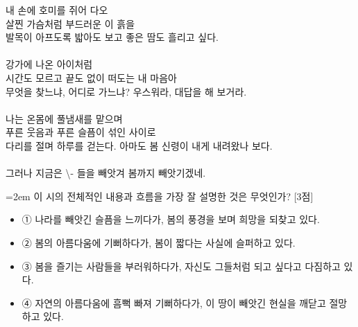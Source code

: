 \documentclass[10pt,a4paper]{article}
\newcommand{\qnum}[1]{%
  \tikz[baseline=(num.base)]{%
    \node[circle, fill=numCircle, text=white, inner sep=0pt,
          minimum size=18pt, font=\small\bfseries] (num) {#1};%
  }%
}
\newcommand{\pts}[1]{%
  \hfill\textcolor{ptsBadge}{[#1점]}%
}
\begin{document}
\begin{tcolorbox}[passage]
내 손에 호미를 쥐어 다오   \\{}
살찐 가슴처럼 부드러운 이 흙을   \\{}
발목이 아프도록 밟아도 보고 좋은 땀도 흘리고 싶다. \\{}
\vspace{4pt} \\{}
강가에 나온 아이처럼   \\{}
시간도 모르고 끝도 없이 떠도는 내 마음아   \\{}
무엇을 찾느냐, 어디로 가느냐? 우스워라, 대답을 해 보거라. \\{}
\vspace{4pt} \\{}
나는 온몸에 풀냄새를 맡으며   \\{}
푸른 웃음과 푸른 슬픔이 섞인 사이로   \\{}
다리를 절며 하루를 걷는다. 아마도 봄 신령이 내게 내려왔나 보다. \\{}
\vspace{4pt} \\{}
그러나 지금은 \textbackslash{}- 들을 빼앗겨 봄까지 빼앗기겠네.
\end{tcolorbox}
\vspace{3mm}
\begin{minipage}{\columnwidth}
{\hangindent=2em
\qnum{17}\enspace 이 시의 전체적인 내용과 흐름을 가장 잘 설명한 것은 무엇인가? \pts{3}
\par}

\vspace{3mm}
\begin{itemize}[leftmargin=2.5em, labelsep=0.3em, label={}, itemsep=4pt, parsep=1pt, topsep=0pt]
  \item ① 나라를 빼앗긴 슬픔을 느끼다가, 봄의 풍경을 보며 희망을 되찾고 있다.
  \item ② 봄의 아름다움에 기뻐하다가, 봄이 짧다는 사실에 슬퍼하고 있다.
  \item ③ 봄을 즐기는 사람들을 부러워하다가, 자신도 그들처럼 되고 싶다고 다짐하고 있다.
  \item ④ 자연의 아름다움에 흠뻑 빠져 기뻐하다가, 이 땅이 빼앗긴 현실을 깨닫고 절망하고 있다.
\end{itemize}
\end{minipage}
\vspace{4mm}
\end{document}
